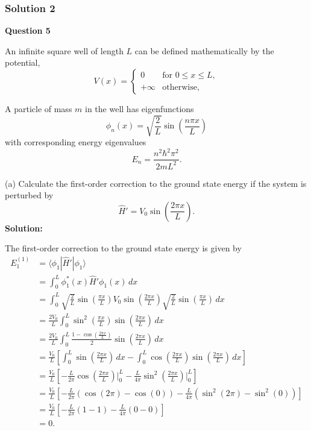 \documentclass{article}
\begin{document}
\subsubsection{Solution 2}
\textbf{Question 5}

An infinite square well of length $L$ can be defined mathematically by the potential,
\[
V(x) = 
\begin{cases}
0 & \text{for } 0 \leq x \leq L, \\
+\infty & \text{otherwise},
\end{cases}
\]

A particle of mass $m$ in the well has eigenfunctions
\[
\phi_n(x) = \sqrt{\frac{2}{L}} \sin\left(\frac{n \pi x}{L}\right)
\]
with corresponding energy eigenvalues
\[
E_n = \frac{n^2 \hbar^2 \pi^2}{2mL^2}.
\]

(a) Calculate the first-order correction to the ground state energy if the system is perturbed by
\[
\hat{H}' = V_0 \sin\left(\frac{2\pi x}{L}\right).
\]
\textbf{Solution:}

The first-order correction to the ground state energy is given by
\begin{align*}
E_1^{(1)} &= \langle \phi_1 | \hat{H}' | \phi_1 \rangle \\
&= \int_0^L \phi_1^*(x) \hat{H}' \phi_1(x) \, dx \\
&= \int_0^L \sqrt{\frac{2}{L}} \sin\left(\frac{\pi x}{L}\right) V_0 \sin\left(\frac{2\pi x}{L}\right) \sqrt{\frac{2}{L}} \sin\left(\frac{\pi x}{L}\right) \, dx \\
&= \frac{2V_0}{L} \int_0^L \sin^2\left(\frac{\pi x}{L}\right) \sin\left(\frac{2\pi x}{L}\right) \, dx \\
&= \frac{2V_0}{L} \int_0^L \frac{1 - \cos\left(\frac{2\pi x}{L}\right)}{2} \sin\left(\frac{2\pi x}{L}\right) \, dx \\
&= \frac{V_0}{L} \left[ \int_0^L \sin\left(\frac{2\pi x}{L}\right) \, dx - \int_0^L \cos\left(\frac{2\pi x}{L}\right) \sin\left(\frac{2\pi x}{L}\right) \, dx \right] \\
&= \frac{V_0}{L} \left[ -\frac{L}{2\pi} \cos\left(\frac{2\pi x}{L}\right) \bigg|_0^L - \frac{L}{4\pi} \sin^2\left(\frac{2\pi x}{L}\right) \bigg|_0^L \right] \\
&= \frac{V_0}{L} \left[ -\frac{L}{2\pi} (\cos(2\pi) - \cos(0)) - \frac{L}{4\pi} (\sin^2(2\pi) - \sin^2(0)) \right] \\
&= \frac{V_0}{L} \left[ -\frac{L}{2\pi} (1 - 1) - \frac{L}{4\pi} (0 - 0) \right] \\
&= \boxed{0}.
\end{align*}
\end{document}
